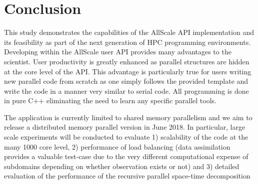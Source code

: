 \documentclass[conference,compsoc]{IEEEtran}
\begin{document}
\section{Conclusion}
This study demonstrates the capabilities of the AllScale API implementation and its feasibility as part of the next generation of HPC programming environments. Developing within the AllScale user API provides many advantages to the scientist. User productivity is greatly enhanced as parallel structures are hidden at the core level of the API. This advantage is particularly true for users writing new parallel code from scratch as one simply follows the provided template and write the code in a manner very similar to serial code. All programming is done in pure C++ eliminating the need to learn any specific parallel tools. 

The application is currently limited to shared memory parallelism and we aim to release a distributed memory parallel version in June 2018. In particular, large scale experiments will be conducted to evaluate 1) scalability of the code at the many 1000 core level, 2) performance of load balancing (data assimilation provides a valuable test-case due to the very different computational expense of subdomains depending on whether observation exists or not) and 3) detailed evaluation of the performance of the recursive parallel space-time decomposition
\end{document}
